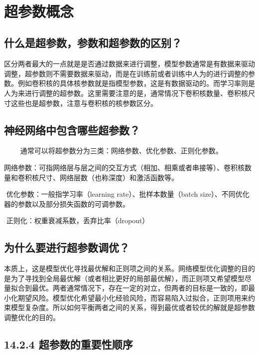 ​

\section{ 超参数概念}\label{ux8d85ux53c2ux6570ux6982ux5ff5}

\subsection{什么是超参数，参数和超参数的区别？}\label{ux4ec0ux4e48ux662fux8d85ux53c2ux6570ux53c2ux6570ux548cux8d85ux53c2ux6570ux7684ux533aux522b}

​
区分两者最大的一点就是是否通过数据来进行调整，模型参数通常是有数据来驱动调整，超参数则不需要数据来驱动，而是在训练前或者训练中人为的进行调整的参数。例如卷积核的具体核参数就是指模型参数，这是有数据驱动的。而学习率则是人为来进行调整的超参数。这里需要注意的是，通常情况下卷积核数量、卷积核尺寸这些也是超参数，注意与卷积核的核参数区分。

\subsection{神经网络中包含哪些超参数？}\label{ux795eux7ecfux7f51ux7edcux4e2dux5305ux542bux54eaux4e9bux8d85ux53c2ux6570}

　　 通常可以将超参数分为三类：网络参数、优化参数、正则化参数。

​
网络参数：可指网络层与层之间的交互方式（相加、相乘或者串接等）、卷积核数量和卷积核尺寸、网络层数（也称深度）和激活函数等。

​ 优化参数：一般指学习率（learning rate）、批样本数量（batch
size）、不同优化器的参数以及部分损失函数的可调参数。

​ 正则化：权重衰减系数，丢弃比率（dropout）

\subsection{为什么要进行超参数调优？}\label{ux4e3aux4ec0ux4e48ux8981ux8fdbux884cux8d85ux53c2ux6570ux8c03ux4f18}

​
本质上，这是模型优化寻找最优解和正则项之间的关系。网络模型优化调整的目的是为了寻找到全局最优解（或者相比更好的局部最优解），而正则项又希望模型尽量拟合到最优。两者通常情况下，存在一定的对立，但两者的目标是一致的，即最小化期望风险。模型优化希望最小化经验风险，而容易陷入过拟合，正则项用来约束模型复杂度。所以如何平衡两者之间的关系，得到最优或者较优的解就是超参数调整优化的目的。

\subsection{14.2.4
超参数的重要性顺序}\label{ux8d85ux53c2ux6570ux7684ux91cdux8981ux6027ux987aux5e8f}

